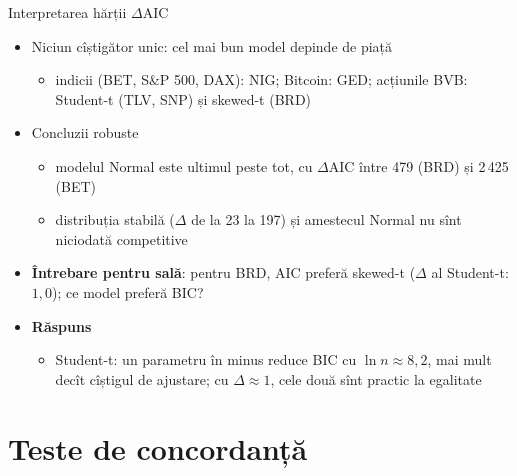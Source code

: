 \begin{frame}{Interpretarea hărții $\Delta$AIC}
\itemsize{\small}
\begin{itemize}
    \item Niciun cîștigător unic: cel mai bun model depinde de piață
    \begin{itemize}
        \item indicii (BET, S\&P 500, DAX): NIG; Bitcoin: GED; acțiunile BVB: Student-t (TLV, SNP) și skewed-t (BRD)
    \end{itemize}
    \item Concluzii robuste
    \begin{itemize}
        \item modelul Normal este ultimul peste tot, cu $\Delta$AIC între 479 (BRD) și 2\,425 (BET)
        \item distribuția stabilă ($\Delta$ de la 23 la 197) și amestecul Normal nu sînt niciodată competitive
    \end{itemize}
    \item \textbf{Întrebare pentru sală}: pentru BRD, AIC preferă skewed-t ($\Delta$ al Student-t: $1{,}0$); ce model preferă BIC?
    \item \textbf{Răspuns}
    \begin{itemize}
        \item Student-t: un parametru în minus reduce BIC cu $\ln n \approx 8{,}2$, mai mult decît cîștigul de ajustare; cu $\Delta \approx 1$, cele două sînt practic la egalitate
    \end{itemize}
\end{itemize}
\end{frame}


\section{Teste de concordanță}

